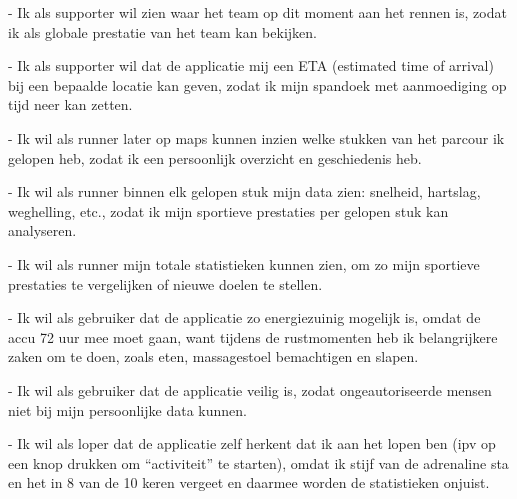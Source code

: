 \documentclass[../main.tex]{subfiles}
\begin{document}
    - Ik als supporter wil zien waar het team op dit moment aan het rennen is, zodat ik als globale
    prestatie van het team kan bekijken.

    - Ik als supporter wil dat de applicatie mij een ETA (estimated time of arrival) bij een bepaalde locatie
    kan geven, zodat ik mijn spandoek met aanmoediging op tijd neer kan zetten.

    - Ik wil als runner later op maps kunnen inzien welke stukken van het parcour ik gelopen heb, zodat ik
    een persoonlijk overzicht en geschiedenis heb.

    - Ik wil als runner binnen elk gelopen stuk mijn data zien: snelheid, hartslag, weghelling, etc., zodat ik
    mijn sportieve prestaties per gelopen stuk kan analyseren.

    - Ik wil als runner mijn totale statistieken kunnen zien, om zo mijn sportieve prestaties te vergelijken
    of nieuwe doelen te stellen.

    - Ik wil als gebruiker dat de applicatie zo energiezuinig mogelijk is, omdat de accu 72 uur mee moet
    gaan, want tijdens de rustmomenten heb ik belangrijkere zaken om te doen, zoals eten,
    massagestoel bemachtigen en slapen.

    - Ik wil als gebruiker dat de applicatie veilig is, zodat ongeautoriseerde mensen niet bij mijn
    persoonlijke data kunnen.

    - Ik wil als loper dat de applicatie zelf herkent dat ik aan het lopen ben (ipv op een knop drukken om
    “activiteit” te starten), omdat ik stijf van de adrenaline sta en het in 8 van de 10 keren vergeet en
    daarmee worden de statistieken onjuist.
\end{document}
